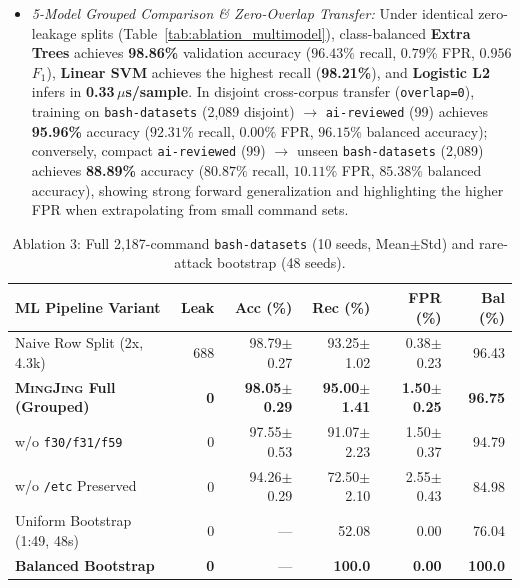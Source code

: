 \documentclass[10pt,twocolumn,letterpaper]{article}
\newcommand{\sys}{\textsc{MingJing}}
\newcommand{\code}[1]{\texttt{\small #1}}
\begin{document}
\begin{itemize}
  \item \emph{5-Model Grouped Comparison \& Zero-Overlap Transfer:} Under identical zero-leakage splits (Table~\ref{tab:ablation_multimodel}), class-balanced \textbf{Extra Trees} achieves \textbf{98.86\%} validation accuracy ($96.43\%$ recall, $0.79\%$ FPR, $0.956$ $F_1$), \textbf{Linear SVM} achieves the highest recall (\textbf{98.21\%}), and \textbf{Logistic L2} infers in \textbf{0.33\,$\mu$s/sample}. In disjoint cross-corpus transfer (\code{overlap=0}), training on \code{bash-datasets} (2,089 disjoint) $\to$ \code{ai-reviewed} (99) achieves \textbf{95.96\%} accuracy ($92.31\%$ recall, $0.00\%$ FPR, $96.15\%$ balanced accuracy); conversely, compact \code{ai-reviewed} (99) $\to$ unseen \code{bash-datasets} (2,089) achieves \textbf{88.89\%} accuracy ($80.87\%$ recall, $10.11\%$ FPR, $85.38\%$ balanced accuracy), showing strong forward generalization and highlighting the higher FPR when extrapolating from small command sets.
\end{itemize}

\begin{table}[t]
\centering
\scriptsize
\setlength{\tabcolsep}{1.2pt}
\caption{Ablation 3: Full 2,187-command \code{bash-datasets} (10 seeds, Mean$\pm$Std) and rare-attack bootstrap (48 seeds).}
\label{tab:ablation_ml}
\begin{tabular}{@{}lrrrrr@{}}
\toprule
\textbf{ML Pipeline Variant} & \textbf{Leak} & \textbf{Acc (\%)} & \textbf{Rec (\%)} & \textbf{FPR (\%)} & \textbf{Bal (\%)} \\
\midrule
Naive Row Split (2x, 4.3k)      & 688 & 98.79$\pm$0.27 & 93.25$\pm$1.02 & 0.38$\pm$0.23 & 96.43 \\
\textbf{\sys{} Full (Grouped)}  & \textbf{0} & \textbf{98.05$\pm$0.29} & \textbf{95.00$\pm$1.41} & \textbf{1.50$\pm$0.25} & \textbf{96.75} \\
w/o \code{f30/f31/f59}          & 0   & 97.55$\pm$0.53 & 91.07$\pm$2.23 & 1.50$\pm$0.37 & 94.79 \\
w/o \code{/etc} Preserved       & 0   & 94.26$\pm$0.29 & 72.50$\pm$2.10 & 2.55$\pm$0.43 & 84.98 \\
\midrule
Uniform Bootstrap (1:49, 48s)   & 0   & ---            & 52.08          & 0.00          & 76.04 \\
\textbf{Balanced Bootstrap}     & \textbf{0} & ---     & \textbf{100.0} & \textbf{0.00} & \textbf{100.0} \\
\bottomrule
\end{tabular}
\end{table}
\end{document}
